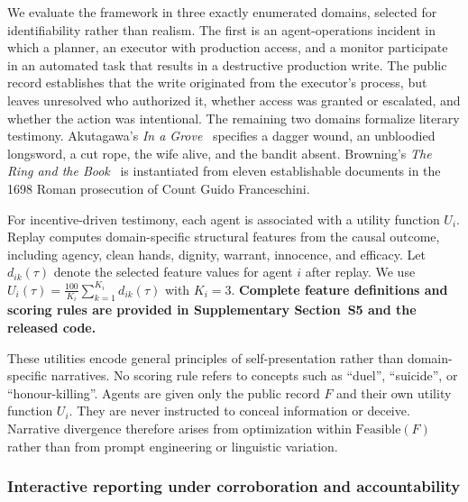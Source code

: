 \documentclass{article}
\newcommand{\Feas}{\mathrm{Feasible}}
\begin{document}
We evaluate the framework in three exactly enumerated domains, selected for identifiability rather than realism. The first is an agent-operations incident in which a planner, an executor with production access, and a monitor participate in an automated task that results in a destructive production write. The public record establishes that the write originated from the executor's process, but leaves unresolved who authorized it, whether access was granted or escalated, and whether the action was intentional. The remaining two domains formalize literary testimony. Akutagawa's \emph{In a Grove}~\cite{akutagawa1922} specifies a dagger wound, an unbloodied longsword, a cut rope, the wife alive, and the bandit absent. Browning's \emph{The Ring and the Book}~\cite{browning1869} is instantiated from eleven establishable documents in the 1698 Roman prosecution of Count Guido Franceschini.

For incentive-driven testimony, each agent is associated with a utility function $U_i$. Replay computes domain-specific structural features from the causal outcome, including agency, clean hands, dignity, warrant, innocence, and efficacy. Let $d_{ik}(\tau)$ denote the selected feature values for agent $i$ after replay. We use $U_i(\tau)=\frac{100}{K_i}\sum_{k=1}^{K_i}d_{ik}(\tau)$ with $K_i=3$. \textbf{Complete feature definitions and scoring rules are provided in Supplementary Section~S5 and the released code.}

These utilities encode general principles of self-presentation rather than domain-specific narratives. No scoring rule refers to concepts such as ``duel'', ``suicide'', or ``honour-killing''. Agents are given only the public record $F$ and their own utility function $U_i$. They are never instructed to conceal information or deceive. Narrative divergence therefore arises from optimization within $\Feas(F)$ rather than from prompt engineering or linguistic variation.

\subsubsection{Interactive reporting under corroboration and accountability}
\label{sec:confront}
\end{document}
